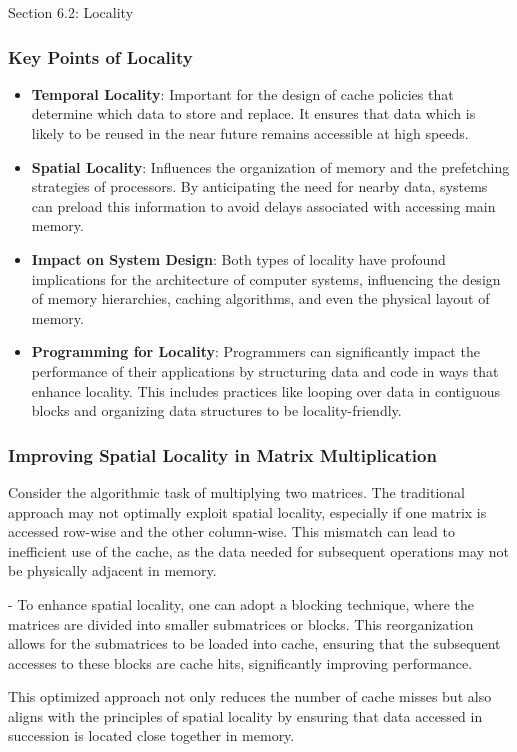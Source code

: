 \begin{notes}{Section 6.2: Locality}
    \subsubsection*{Key Points of Locality}
    
    \begin{itemize}
        \item \textbf{Temporal Locality}: Important for the design of cache policies that determine which data to store and replace. It ensures that data which is likely to be reused in the near 
        future remains accessible at high speeds.
        \item \textbf{Spatial Locality}: Influences the organization of memory and the prefetching strategies of processors. By anticipating the need for nearby data, systems can preload this 
        information to avoid delays associated with accessing main memory.
        \item \textbf{Impact on System Design}: Both types of locality have profound implications for the architecture of computer systems, influencing the design of memory hierarchies, caching 
        algorithms, and even the physical layout of memory.
        \item \textbf{Programming for Locality}: Programmers can significantly impact the performance of their applications by structuring data and code in ways that enhance locality. This includes 
        practices like looping over data in contiguous blocks and organizing data structures to be locality-friendly.
    \end{itemize}
    
    \begin{highlight}
        \subsubsection*{Improving Spatial Locality in Matrix Multiplication}
    
        Consider the algorithmic task of multiplying two matrices. The traditional approach may not optimally exploit spatial locality, especially if one matrix is accessed row-wise and the other 
        column-wise. This mismatch can lead to inefficient use of the cache, as the data needed for subsequent operations may not be physically adjacent in memory.
    
    \begin{code}[Optimization]
    - To enhance spatial locality, one can adopt a blocking technique, where the matrices are divided into smaller submatrices or blocks. This reorganization allows for the submatrices to be loaded into cache, ensuring that the subsequent accesses to these blocks are cache hits, significantly improving performance.
    \end{code}
        This optimized approach not only reduces the number of cache misses but also aligns with the principles of spatial locality by ensuring that data accessed in succession is located close 
        together in memory.
    \end{highlight}
    

\end{notes}
